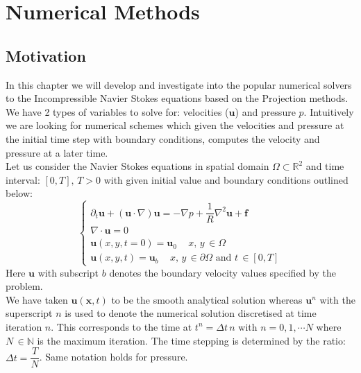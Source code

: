\chapter{Numerical Methods}
\label{chapter3}
\section{Motivation}
In this chapter we will develop and investigate into the popular numerical solvers to the Incompressible Navier Stokes equations based on the Projection methods.\\

We have 2 types of variables to solve for: velocities ($\textbf{u}$) and pressure $p$. Intuitively we are looking for numerical schemes which given the velocities and pressure at the initial time step with boundary conditions, computes the velocity and pressure at a later time.\\

Let us consider the Navier Stokes equations in spatial domain $\Omega \subset \mathbb{R}^2$ and time interval: $[0,T],\,T>0$ with given initial value and boundary conditions outlined below:
\begin{equation}
\begin{cases}
\partial_t \textbf{u} + (\textbf{u} \cdot \nabla)\textbf{u} = -\nabla p + \dfrac{1}{R}\nabla^2\textbf{u} + \textbf{f}\\
\nabla \cdot \textbf{u}=0\\
\textbf{u}(x,y,t=0) = \textbf{u}_0\,\,\,\text{   $x,\,y\,\in \Omega$}\\
\textbf{u}(x,y,t) = \textbf{u}_b\,\,\,\text{   $x,\,y\,\in \partial\Omega$ and $t\,\in [0,T]$}
\end{cases}
\end{equation} 
Here $\textbf{u}$ with subscript $b$ denotes the boundary velocity values specified by the problem.\\

We have taken $\textbf{u}(\textbf{x},t)$ to be the smooth analytical solution whereas $\textbf{u}^n$ with the superscript $n$ is used to denote the numerical solution discretised at time iteration $n$. This corresponds to the time at $t^n = \Delta t\,n$ with $n = 0,1,\cdots N$ where $N\,\in \mathbb{N}$ is the maximum iteration. The time stepping is determined by the ratio: $\Delta t=\dfrac{T}{N}$. Same notation holds for pressure.\\

